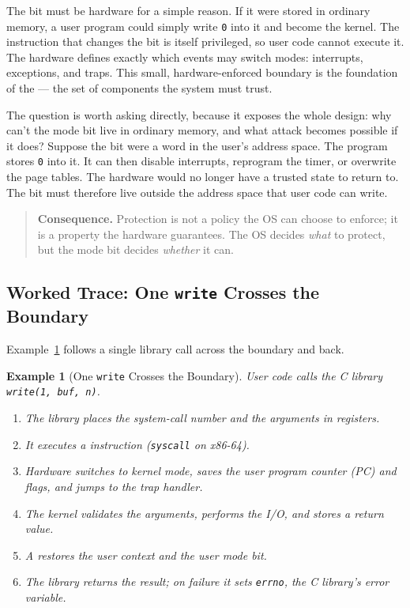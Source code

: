 \documentclass[11pt]{article}
\newtheorem{example}{Example}[section]
\begin{document}
The bit must be hardware for a simple reason. If it were stored in ordinary
memory, a user program could simply write \texttt{0} into it and become the
kernel. The instruction that changes the bit is itself privileged, so user code
cannot execute it. The hardware defines exactly which events may switch modes:
interrupts, exceptions, and traps. This small, hardware-enforced boundary is
the foundation of the  --- the set of components
the system must trust.

The question is worth asking directly, because it exposes the whole design: why
can't the mode bit live in ordinary memory, and what attack becomes possible if
it does? Suppose the bit were a word in the user's address space. The program
stores \texttt{0} into it. It can then disable interrupts, reprogram the timer,
or overwrite the page tables. The hardware would no longer have a trusted state
to return to. The bit must therefore live outside the address space that user
code can write.

\begin{quote}
\textbf{Consequence.} Protection is not a policy the OS can choose to enforce;
it is a property the hardware guarantees. The OS decides \emph{what} to
protect, but the mode bit decides \emph{whether} it can.
\end{quote}

\subsection{Worked Trace: One \texttt{write} Crosses the Boundary}

Example~\ref{ex:write} follows a single library call across the boundary and
back.

\begin{example}[One \texttt{write} Crosses the Boundary]
\label{ex:write}
User code calls the C library \texttt{write(1, buf, n)}.
\begin{enumerate}
  \item The library places the system-call number and the arguments in
    registers.
  \item It executes a  instruction (\texttt{syscall} on x86-64).
  \item Hardware switches to kernel mode, saves the user program counter (PC)
    and flags, and jumps to the trap handler.
  \item The kernel validates the arguments, performs the I/O, and stores a
    return value.
  \item A  restores the user context and the user mode
    bit.
  \item The library returns the result; on failure it sets \texttt{errno}, the
    C library's error variable.
\end{enumerate}
\end{example}
\end{document}
